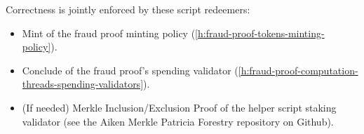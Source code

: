 \documentclass[../midgard.tex]{subfiles}
\begin{document}
Correctness is jointly enforced by these script redeemers:
\begin{itemize}
  \item Mint of the fraud proof minting policy (\cref{h:fraud-proof-tokens-minting-policy}).
  \item Conclude of the fraud proof's spending validator (\cref{h:fraud-proof-computation-threads-spending-validators}).
  \item (If needed) Merkle Inclusion/Exclusion Proof of the helper script staking validator (see the Aiken Merkle Patricia Forestry repository on Github).
\end{itemize}
\end{document}
